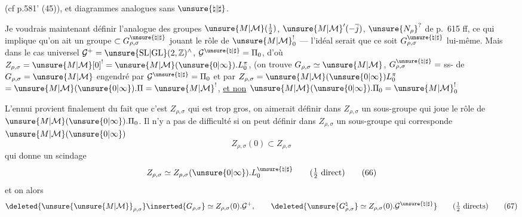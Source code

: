 (cf p.581' (45)), et diagrammes analogues sans $\unsure{\natural|\sharp}$.





Je voudrais maintenant définir l'analogue des groupes
$\unsure{M|\mathcal{M}}(\tfrac12)$, $\unsure{M|\mathcal{M}}'(-\overline j)$,
$\unsure{N_\rho}^{?}$
de p.~615 ff,
ce qui implique qu'on ait un groupe $\subset G_{\rho,\sigma}^{\unsure{\natural|\sharp}}$
jouant le rôle de $\unsure{M|\mathcal{M}}^{!}_0$ --- l'idéal serait que ce soit
$G_{\rho,\sigma}^{\unsure{\natural|\sharp}}$ lui-même.
Mais dans le cas universel
$\mathcal{G}^+=\unsure{\mathrm{SL}|\mathrm{GL}}(2,\mathbb Z)^\wedge$,
$\mathcal{G}^{\unsure{\natural|\sharp}}=\Pi_0$,
d'où
$Z_{\rho,\sigma}=\unsure{M|\mathcal{M}}[0]^{!}=\unsure{M|\mathcal{M}}(\unsure{0|\infty}).L_0^\pi$,
(on trouve $G_{\rho,\sigma}\simeq \unsure{M|\mathcal{M}}$,
$G_{\rho,\sigma}^{\unsure{\natural|\sharp}}={}$ss-
de $G_{\rho,\sigma}=\unsure{M|\mathcal{M}}$ engendré par
$\mathcal{G}^{\unsure{\natural|\sharp}}=\Pi_0$
et par $Z_{\rho,\sigma}=\unsure{M|\mathcal{M}}(\unsure{0|\infty})L_0^\pi$
$=\unsure{M|\mathcal{M}}(\unsure{0|\infty}).\Pi=\unsure{M|\mathcal{M}}^{!}$,
\uline{et non} $\unsure{M|\mathcal{M}}(\unsure{0|\infty}).\Pi_0=\unsure{M|\mathcal{M}}^{!}_0$\deleted{$\unsure{!}$}

L'ennui provient finalement du fait que c'est $Z_{\rho,\sigma}$
qui est trop gros, on aimerait définir dans $Z_{\rho,\sigma}$ un sous-groupe
qui joue le rôle de $\unsure{M|\mathcal{M}}(\unsure{0|\infty}).\Pi_0$. Il n'y a pas de difficulté si on peut définir
dans  $Z_{\rho,\sigma}$ un sous-groupe qui
corresponde  $\unsure{M|\mathcal{M}}(\unsure{0|\infty})$
\[
Z_{\rho,\sigma}(0)\subset Z_{\rho,\sigma}
\tag{65}
\]
qui donne un scindage
\[
Z_{\rho,\sigma}\simeq Z_{\rho,\sigma}(\unsure{0|\infty}).L_0^{\unsure{\natural|\sharp}}
\qquad (\tfrac12\ \text{direct})
\tag{66}
\]
et on  alors
\[
\deleted{\unsure{\unsure{M|\mathcal{M}}}_{\rho,\sigma}}\inserted{G_{\rho,\sigma}}
\simeq Z_{\rho,\sigma}(0).\mathcal{G}^+,
\qquad
\deleted{\unsure{G_{\rho,\sigma}^{\natural}}\simeq
Z_{\rho,\sigma}(0).\mathcal{G}^{\unsure{\natural|\sharp}}}
\qquad (\tfrac12\ \text{directs})
\tag{67}
\]


